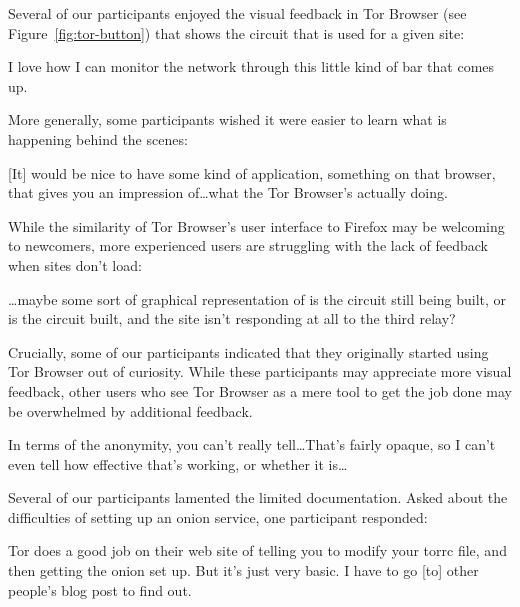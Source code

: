 Several of our participants enjoyed the visual feedback in Tor Browser (see
Figure~\ref{fig:tor-button}) that shows the circuit that is used for a given
site:

\begin{displayquote}
I love how I can monitor the network through this little kind of bar that
comes up.
\end{displayquote}

More generally, some participants wished it were easier to learn what is
happening behind the scenes:

\begin{displayquote}
{[It]} would be nice to have some kind of application, something on that browser,
that gives you an impression of\dots what the Tor Browser's actually doing.
\end{displayquote}

While the similarity of Tor
Browser's user interface to Firefox may be welcoming to newcomers, more
experienced users are struggling with the lack of feedback when sites don't
load:

\begin{displayquote}
\dots maybe some sort of graphical representation of is the circuit still
being built, or is the circuit built, and the site isn't responding at all to
the third relay?
\end{displayquote}

Crucially, some of our participants indicated that they originally started using
Tor Browser out of curiosity.  While these participants may appreciate more
visual feedback, other users who see Tor Browser as a mere tool to get the job
done may be overwhelmed by additional feedback.

\begin{displayquote}
In terms of the anonymity, you can't really tell\dots That's fairly opaque, so I
can't even tell how effective that's working, or whether it is\dots
\end{displayquote}

Several of our participants lamented the limited documentation.  Asked about the
difficulties of setting up an onion service, one participant responded:

\begin{displayquote}
Tor does a good job on their web site of telling you to modify your torrc file,
and then getting the onion set up.  But it's just very basic.  I have to go [to]
other people's blog post to find out.
\end{displayquote}

